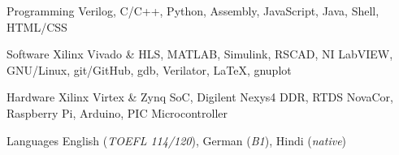 
\begin{cvskills}

\cvskill
	{Programming} %
	{Verilog, C/C++, Python, Assembly, JavaScript, Java, Shell, HTML/CSS} %

\cvskill
	{Software} %
	{Xilinx Vivado \& HLS, MATLAB, Simulink, RSCAD, NI LabVIEW, GNU/Linux, git/GitHub, gdb, Verilator, \LaTeX, gnuplot} %

\cvskill
	{Hardware} %
	{Xilinx Virtex \& Zynq SoC, Digilent Nexys4 DDR, RTDS NovaCor, Raspberry Pi, Arduino, PIC Microcontroller} %

\cvskill
	{Languages} %
	{English (\textit{TOEFL 114/120}), German (\textit{B1}), Hindi (\textit{native})} %

\end{cvskills}
